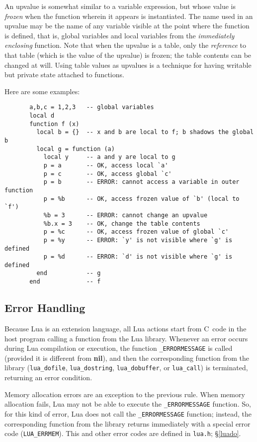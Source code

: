 \documentclass[11pt]{article}
\makeatletter
\newcommand{\See}[1]{\S\ref{#1}}
\newcommand{\nil}{{\bf nil}}
\newcommand{\DefLIB}[1]{\index{#1@{\tt #1}}}
\makeatother
\begin{document}
An upvalue is somewhat similar to a variable expression,
but whose value is \emph{frozen} when the function wherein it
appears is instantiated.
The name used in an upvalue may be the name of any variable visible
at the point where the function is defined,
that is,
global variables and local variables
from the \emph{immediately enclosing} function.
Note that when the upvalue is a table,
only the \emph{reference} to that table
(which is the value of the upvalue) is frozen;
the table contents can be changed at will.
Using table values as upvalues is a technique for having
writable but private state attached to functions.

Here are some examples:
\begin{verbatim}
       a,b,c = 1,2,3   -- global variables
       local d
       function f (x)
         local b = {}  -- x and b are local to f; b shadows the global b
         local g = function (a)
           local y     -- a and y are local to g
           p = a       -- OK, access local `a'
           p = c       -- OK, access global `c'
           p = b       -- ERROR: cannot access a variable in outer function
           p = %b      -- OK, access frozen value of `b' (local to `f')
           %b = 3      -- ERROR: cannot change an upvalue
           %b.x = 3    -- OK, change the table contents
           p = %c      -- OK, access frozen value of global `c'
           p = %y      -- ERROR: `y' is not visible where `g' is defined
           p = %d      -- ERROR: `d' is not visible where `g' is defined
         end           -- g
       end             -- f
\end{verbatim}


\subsection{Error Handling} \label{error}

Because Lua is an extension language,
all Lua actions start from C~code in the host program
calling a function from the Lua library.
Whenever an error occurs during Lua compilation or execution,
the function \verb|_ERRORMESSAGE| is called \DefLIB{_ERRORMESSAGE}
(provided it is different from \nil),
and then the corresponding function from the library
(\verb|lua_dofile|, \verb|lua_dostring|,
\verb|lua_dobuffer|, or \verb|lua_call|)
is terminated, returning an error condition.

Memory allocation errors are an exception to the previous rule.
When memory allocation fails, Lua may not be able to execute the
\verb|_ERRORMESSAGE| function.
So, for this kind of error, Lua does not call
the \verb|_ERRORMESSAGE| function;
instead, the corresponding function from the library
returns immediately with a special error code (\verb|LUA_ERRMEM|).
This and other error codes are defined in \verb|lua.h|;
\See{luado}.
\end{document}
